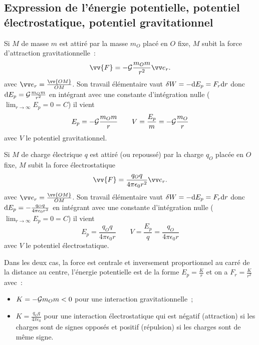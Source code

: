 \subsection{Expression de l'énergie potentielle, potentiel électrostatique, 
potentiel gravitationnel}
Si \(M\) de masse \(m\) est attiré par la masse \(m_O\) placé en \(O\) fixe, 
\(M\) subit la force d'attraction gravitationnelle~:
\begin{equation}%
  \vv{F} = -\Gb \frac{m_O m}{r^2} \er.
\end{equation}%
avec \(\er = \frac{\vv{OM}}{OM}\). Son travail élémentaire vaut \(\delta W = 
-\mathrm{d} E_p = F_r \mathrm{d} r\) donc \(\mathrm{d} E_p = \mathcal{G}\frac{m_O m}{r^2}\) en intégrant avec 
une constante d'intégration nulle (\(\lim_{r\to\infty} E_p = 0 = C\)) il vient
\begin{equation}%
  E_p = -\Gb \frac{m_O m}{r} \qquad V = \frac{E_p}{m} = -\Gb \frac{m_O}{r}
\end{equation}%
avec \(V\) le potentiel gravitationnel.

Si \(M\) de charge électrique \(q\) est attiré (ou repoussé) par la charge 
\(q_O\) placée en \(O\) fixe, \(M\) subit la force électrostatique
\begin{equation}%
  \vv{F} = \frac{q_O q}{4\pi\epsilon_0r^2} \er.
\end{equation}%
avec \(\er = \frac{\vv{OM}}{OM}\). Son travail élémentaire vaut \(\delta W = 
-\mathrm{d} E_p = F_r \mathrm{d} r\) donc \(\mathrm{d} E_p = - \frac{q_O q}{4\pi\epsilon_0r^2}\)
en intégrant avec une constante d'intégration nulle (\(\lim_{r\to\infty}
E_p = 0 = C\)) il vient
\begin{equation}%
  E_p = \frac{q_O q}{4\pi\epsilon_0 r} \qquad V = \frac{E_p}{q} = 
  \frac{q_O}{4\pi\epsilon_0 r}
\end{equation}%
avec \(V\) le potentiel électrostatique.

Dans les deux cas, la force est centrale et inversement proportionnel au carré 
de la distance au centre, l'énergie potentielle est de la forme \(E_p = 
\frac{K}{r}\) et on a \(F_r = \frac{K}{r^2}\) avec~:%
\begin{itemize}%
  \item \(K = -\mathcal{G} m_O m < 0\) pour une interaction gravitationnelle~;
  \item \(K = \frac{q_O q}{4\pi\epsilon_0}\) pour une interaction 
    électrostatique qui est négatif (attraction) si les charges sont de signes
    opposés et positif (répulsion) si les charges sont de même signe.
\end{itemize}%
